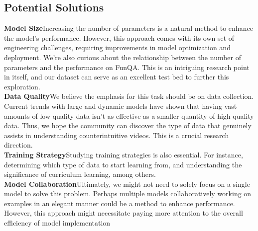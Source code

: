 \subsection{Potential Solutions}
\noindent\textbf{Model Size}\quad Increasing the number of parameters is a natural method to enhance the model's performance. However, this approach comes with its own set of engineering challenges, requiring improvements in model optimization and deployment. We're also curious about the relationship between the number of parameters and the performance on FunQA. This is an intriguing research point in itself, and our dataset can serve as an excellent test bed to further this exploration.\\
\noindent\textbf{Data Quality}\quad We believe the emphasis for this task should be on data collection. Current trends with large and dynamic models have shown that having vast amounts of low-quality data isn't as effective as a smaller quantity of high-quality data. Thus, we hope the community can discover the type of data that genuinely assists in understanding counterintuitive videos. This is a crucial research direction.\\
\noindent\textbf{Training Strategy}\quad Studying training strategies is also essential. For instance, determining which type of data to start learning from, and understanding the significance of curriculum learning, among others.\\
\noindent\textbf{Model Collaboration}\quad Ultimately, we might not need to solely focus on a single model to solve this problem. Perhaps multiple models collaboratively working on examples in an elegant manner could be a method to enhance performance. However, this approach might necessitate paying more attention to the overall efficiency of model implementation

